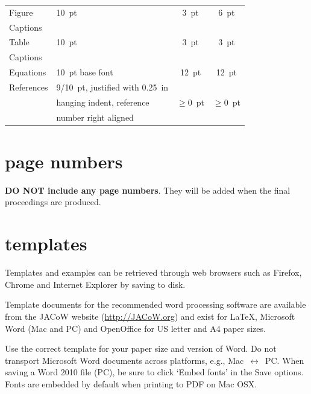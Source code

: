 \documentclass[acus,%
              ]{jacow}
\begin{document}
\begin{table}[h!t]
\begin{tabular}{@{}llcc@{}}
        \midrule
         Figure        & \SI{10}{pt}                 & \SI{3}{pt}           & \SI{6}{pt}  \\
         Captions      &                             &                 &      \\
        \midrule
         Table         & \SI{10}{pt}                      & \SI{3}{pt}           & \SI{3}{pt}  \\
         Captions      &                             &                 &      \\
        \midrule
         Equations     & \SI{10}{pt} base font            & \SI{12}{pt}          & \SI{12}{pt} \\
        \midrule
         References    & \SI{9/10}{pt}, justified with  \SI{0.25}{in} &      &  \\
                       & hanging indent, reference   & $\ge$\SI{0}{pt} & $\ge$\SI{0}{pt}  \\
                       & number right aligned     &                 &        \\
        \bottomrule
    \end{tabular}
\end{table}

\section{page numbers}

\textbf{DO NOT include any page numbers}. They will be added
when the final proceedings are produced.

\section{templates}

Templates and examples can be retrieved through web
browsers such as Firefox, Chrome and Internet Explorer by saving to disk.

Template documents for the recommended word processing software are
available from the JACoW website (\url{http://JACoW.org}) and exist for
\LaTeX, Microsoft Word (Mac and PC) and OpenOffice for US letter and A4 paper sizes.

Use the correct template for your paper size and version of Word.
Do not transport Microsoft Word documents across platforms, e.g.,
Mac~$\leftrightarrow$~PC. When saving a Word 2010 file (PC), be sure
to click `Embed fonts' in the Save options. Fonts are embedded by default
when printing to PDF on Mac OSX.
\end{document}
